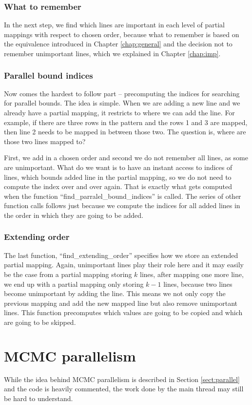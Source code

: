 \subsubsection{What to remember}
In the next step, we find which lines are important in each level of partial mappings with respect to chosen order, because what to remember is based on the equivalence introduced in Chapter \ref{chap:general} and the decision not to remember unimportant lines, which we explained in Chapter \ref{chap:imp}.

\subsubsection{Parallel bound indices}
Now comes the hardest to follow part -- precomputing the indices for searching for parallel bounds. The idea is simple. When we are adding a new line and we already have a partial mapping, it restricts to where we can add the line. For example, if there are three rows in the pattern and the rows 1 and 3 are mapped, then line 2 needs to be mapped in between those two. The question is, where are those two lines mapped to?

First, we add in a chosen order and second we do not remember all lines, as some are unimportant. What do we want is to have an instant access to indices of lines, which bounds added line in the partial mapping, so we do not need to compute the index over and over again. That is exactly what gets computed when the function ``find\_parralel\_bound\_indices'' is called. The series of other function calls follows just because we compute the indices for all added lines in the order in which they are going to be added.

\subsubsection{Extending order}
The last function, ``find\_extending\_order'' specifies how we store an extended partial mapping. Again, unimportant lines play their role here and it may easily be the case from a partial mapping storing $k$ lines, after mapping one more line, we end up with a partial mapping only storing $k-1$ lines, because two lines become unimportant by adding the line. This means we not only copy the previous mapping and add the new mapped line but also remove unimportant lines. This function precomputes which values are going to be copied and which are going to be skipped.

\section{MCMC parallelism}
While the idea behind MCMC parallelism is described in Section \ref{sect:parallel} and the code is heavily commented, the work done by the main thread may still be hard to understand.

